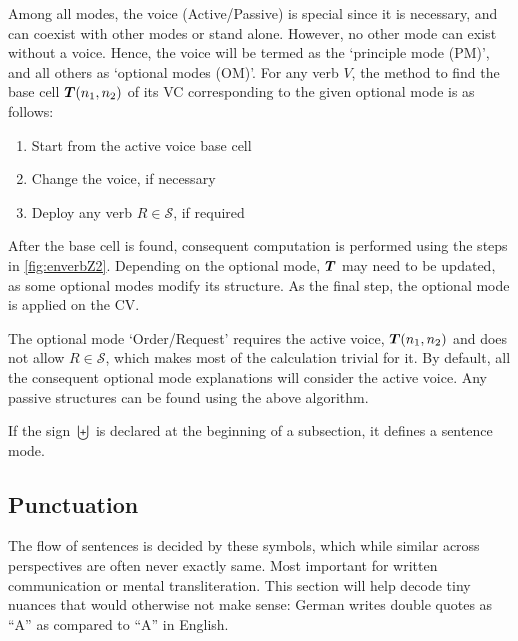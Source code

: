 Among all modes, the voice (Active/Passive) is special since it is necessary, and can coexist with other modes or stand alone. However, no other mode can exist without a voice. Hence, the voice will be termed as the `principle mode (PM)', and all others as `optional modes (OM)'. For any verb $V$, the method to find the base cell $\boldsymbol{T}(n_1,n_2)$ of its VC corresponding to the given optional mode is as follows:
\begin{enumerate}
    \item Start from the active voice base cell
    \item Change the voice, if necessary
    \item Deploy any verb $R\in\mathcal{S}$, if required
\end{enumerate}
After the base cell is found,  consequent computation is performed using the steps in \autoref{fig:enverbZ2}. Depending on the optional mode, $\boldsymbol{T}$ may need to be updated, as some optional modes  modify its structure. As the final step, the optional mode is applied on the CV. 

The optional mode `Order/Request' requires the active voice, $\boldsymbol{T}(n_1,n_2)$ and does not allow $R\in\mathcal{S}$, which makes most of the calculation trivial for it. By default, all the consequent optional mode explanations will  consider the active voice. Any passive structures can be found using the above algorithm.

If the sign $\biguplus $ is declared at the beginning of a subsection, it defines a sentence mode.
\subsection{Punctuation}
The flow of sentences is  decided by these symbols, which while similar across perspectives are often never exactly  same. Most important for written communication or mental transliteration. This section will help decode tiny nuances that would otherwise not make sense: German writes double quotes as \textgerman{\enquote{A}} as compared to \enquote{A} in English.

